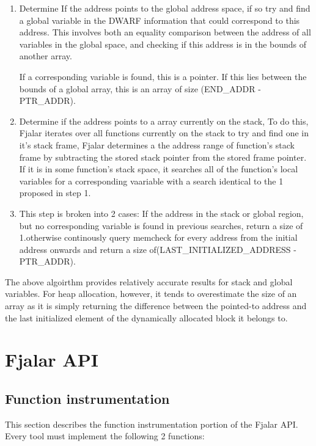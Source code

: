 \documentclass[11pt]{article}
\begin{document}
\begin{enumerate}

\item Determine If the address points to the global address space, if so
   try and find a global variable in the DWARF information that could
   correspond to this address. This involves both an equality comparison
   between the address of all variables in the global space, and checking
   if this address is in the bounds of another array.
   
   If a corresponding variable is found, this is a pointer. If this lies
   between the bounds of a global array, this is an array of size
   (END\_ADDR - PTR\_ADDR). 

\item Determine if the address points to a array currently on the stack,
   To do this, Fjalar iterates over all functions currently on the
   stack to try and find one in it's stack frame, Fjalar determines a
   the address range of function's stack frame by subtracting the
   stored stack pointer from the stored frame pointer. If it is in
   some function's stack space, it searches all of the function's
   local variables for a corresponding vaariable with a search
   identical to the 1 proposed in step 1.

\item This step is broken into 2 cases: If the address in the stack or
  global region, but no corresponding variable is found in previous
  searches, return a size of 1.otherwise continously query memcheck
  for every address from the initial address onwards and return a size
  of(LAST\_INITIALIZED\_ADDRESS - PTR\_ADDR).

\end{enumerate} 
The above algoirthm provides relatively accurate results for stack and
global variables. For heap allocation, however, it tends to
overestimate the size of an array as it is simply returning the
difference between the pointed-to address and the last initialized
element of the dynamically allocated block it belongs to.

\section{Fjalar API}

\subsection{Function instrumentation}
This section describes the function instrumentation portion of the
Fjalar API. Every tool must implement the following 2 functions:
\end{document}
